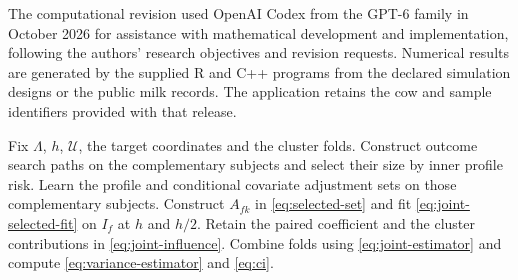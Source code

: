 The computational revision used OpenAI Codex from the GPT-6 family
in October 2026 for assistance with mathematical development and
implementation, following the authors' research objectives and
revision requests. Numerical results are generated by the supplied R
and C++ programs from the declared simulation designs or the public
milk records. The application retains the cow and sample identifiers
provided with that release.

\begin{algorithm}[t]
\caption{Joint profile coordinate inference}\label{alg:estimation}
\begin{algorithmic}[1]
\State Fix $\Lambda$, $h$, $\mathcal U$, the target coordinates and the cluster folds.
\State Construct outcome search paths on the complementary subjects and select their size by inner profile risk.
\State Learn the profile and conditional covariate adjustment sets on those complementary subjects.
\State Construct $A_{fk}$ in \eqref{eq:selected-set} and fit \eqref{eq:joint-selected-fit} on $I_f$ at $h$ and $h/2$.
\State Retain the paired coefficient and the cluster contributions in \eqref{eq:joint-influence}.
\EndFor
\EndFor
\State Combine folds using \eqref{eq:joint-estimator} and compute \eqref{eq:variance-estimator} and \eqref{eq:ci}.
\end{algorithmic}
\end{algorithm}
